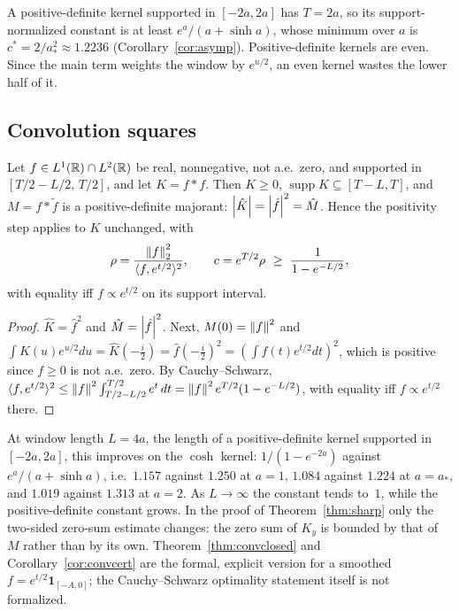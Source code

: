 A positive-definite kernel supported in $[-2a,2a]$ has $T=2a$, so its support-normalized constant is at least
$e^a/(a+\sinh a)$, whose minimum over $a$ is $c^*=2/a_*^2\approx1.2236$ (Corollary~\ref{cor:asymp}). Positive-definite
kernels are even. Since the main term weights the window by $e^{u/2}$, an even kernel wastes the lower half of it.

\subsection{Convolution squares}
\begin{proposition}[informal]\label{prop:convsq}
Let $f\in L^1(\mathbb{R})\cap L^2(\mathbb{R})$ be real, nonnegative, not a.e.\ zero, and supported in $[T/2-L/2,\,T/2]$, and let $K=f*f$. Then $K\ge0$, $\operatorname{supp}K\subseteq[T-L,T]$,
and $M=f*\tilde f$ is a positive-definite majorant: $\left\lvert \hat K \right\rvert=\left\lvert \hat f \right\rvert^2=\hat M$. Hence the positivity step applies to
$K$ unchanged, with
\[
  \rho=\frac{\left\lVert f \right\rVert_2^2}{\langle f,e^{t/2}\rangle^2},\qquad
  c=e^{T/2}\rho\ \ge\ \frac1{1-e^{-L/2}},
\]
with equality iff $f\propto e^{t/2}$ on its support interval.
\end{proposition}
\begin{proof}
$\hat K=\hat f^2$ and $\hat M=\left\lvert \hat f \right\rvert^2$. Next, $M(0)=\left\lVert f \right\rVert^2$ and $\int K(u)e^{u/2}du=\hat K(-\frac i2)=\hat f(-\frac i2)^2=(\int f(t)e^{t/2}dt)^2$, which is positive since $f\ge0$ is not a.e.\ zero.
By Cauchy--Schwarz, $\langle f,e^{t/2}\rangle^2\le\left\lVert f \right\rVert^2\int_{T/2-L/2}^{T/2}e^t\,dt=\left\lVert f \right\rVert^2e^{T/2}(1-e^{-L/2})$, with equality iff
$f\propto e^{t/2}$ there.
\end{proof}

At window length $L=4a$, the length of a positive-definite kernel supported in $[-2a,2a]$, this improves on the $\cosh$ kernel:
$1/(1-e^{-2a})$ against $e^a/(a+\sinh a)$, i.e.\ $1.157$ against $1.250$ at $a=1$, $1.084$ against $1.224$ at $a=a_*$, and $1.019$
against $1.313$ at $a=2$. As $L\to\infty$ the constant tends to~$1$, while the positive-definite constant grows. In the
proof of Theorem~\ref{thm:sharp} only the two-sided zero-sum estimate changes: the zero sum of $K_y$ is bounded by that
of $M$ rather than by its own. Theorem~\ref{thm:convclosed} and Corollary~\ref{cor:convcert} are the formal, explicit
version for a smoothed $f=e^{t/2}\mathbf 1_{[-A,0]}$; the Cauchy--Schwarz optimality statement itself is not formalized.

